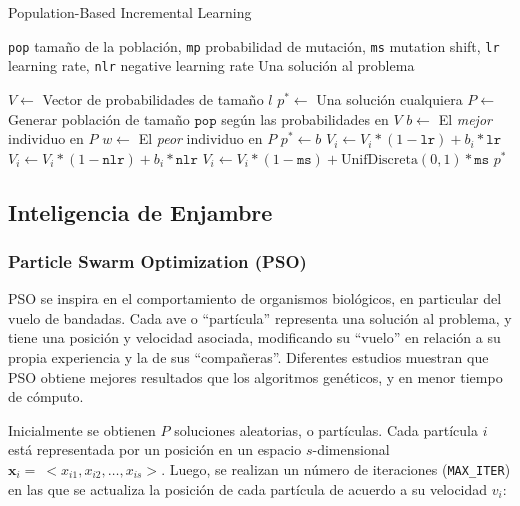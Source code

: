 \begin{algorithm}
\caption{Population-Based Incremental Learning}
\label{pbil-alg}
\begin{algorithmic}[1]

\Require \texttt{pop} tamaño de la población,
	\texttt{mp} probabilidad de mutación,
	\texttt{ms} mutation shift,
	\texttt{lr} learning rate,
	\texttt{nlr} negative learning rate
\Ensure Una solución al problema

\State $V \gets$ Vector de probabilidades de tamaño $l$
\State $p^* \gets$ Una solución cualquiera
	\State $P \gets$ Generar población de tamaño $\texttt{pop}$ según las probabilidades en $V$
	\State $b \gets $ El \emph{mejor} individuo en $P$
	\State $w \gets $ El \emph{peor} individuo en $P$
		\State $p^{*} \gets b$
	\EndIf
	 
		\State $V_i \gets V_i * (1 - \texttt{lr}) + b_i * \texttt{lr}$
			\State $V_i \gets V_i * (1 - \texttt{nlr}) + b_i * \texttt{nlr}$
		\EndIf
		 
			\State $V_i \gets V_i * (1 - \texttt{ms}) + \mathrm{UnifDiscreta}(0,1) * \texttt{ms}$
		\EndIf
	\EndFor
\EndWhile
\State \Return $p^{*}$

\end{algorithmic}
\end{algorithm}

\subsection{Inteligencia de Enjambre}

\subsubsection{Particle Swarm Optimization (PSO)}

\cite{kennedy1995particle}

PSO se inspira en el comportamiento de organismos biológicos, en particular del vuelo de bandadas. Cada ave o ``partícula'' representa una solución al problema, y tiene una posición y velocidad asociada, modificando su ``vuelo'' en relación a su propia experiencia y la de sus ``compañeras''. Diferentes estudios muestran que PSO obtiene mejores resultados que los algoritmos genéticos, y en menor tiempo de cómputo.

Inicialmente se obtienen $P$ soluciones aleatorias, o partículas. Cada partícula $i$ está representada por un posición en un espacio $s$-dimensional \linebreak $\textbf{x}_i =\ <x_{i1},x_{i2},\dots,x_{is}>$. Luego, se realizan un número de iteraciones (\texttt{MAX\_ITER}) en las que se actualiza la posición de cada partícula de acuerdo a su velocidad $v_i$:

